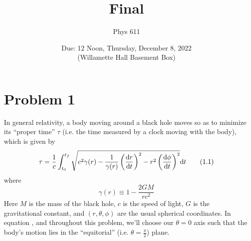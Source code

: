 \documentclass[12pt]{article}
\begin{document}
\title{Final}
\author{Phys 611}
\date{Due: 12 Noon, Thursday, December 8, 2022 \\ (Willamette Hall Basement Box)}
\maketitle

\section*{Problem 1}
In general relativity, a body moving around a black hole moves so as to minimize its ``proper time'' $\tau$ (i.e. the time measured by a clock moving with the body), which is given by
\begin{equation}
    \tau = \frac{1}{c}\int_{t_0}^{t_f}\sqrt{c^2\gamma(r) - \frac{1}{\gamma(r)}\left(\dv{r}{t}\right)^2 - r^2\left(\dv{\phi}{t}\right)^2} \dd t \tag{1.1}\label{eq:1.1}
\end{equation}
where
\begin{equation}
    \gamma(r) \equiv 1 - \frac{2GM}{rc^2} \tag{1.2}\label{eq:1.2}
\end{equation}
Here $M$ is the mass of the black hole, $c$ is the speed of light, $G$ is the gravitational constant, and $(r,\theta,\phi)$ are the usual spherical coordinates. In equation , and throughout this problem, we'll choose our $\theta=0$ axis such that the body's motion lies in the ``equitorial'' (i.e. $\theta=\frac{\pi}{2}$) plane.
\end{document}
